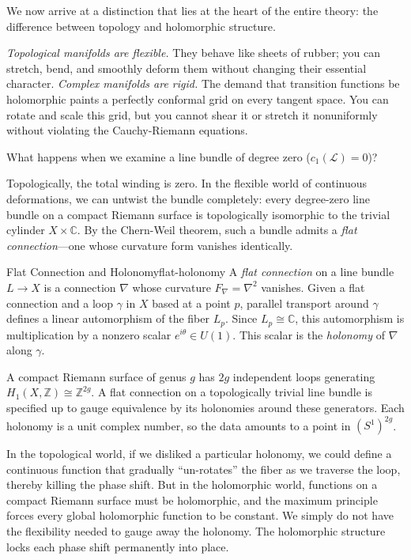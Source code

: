 \documentclass{article}
\newcommand{\C}{{\mathbb{C}}}
\newcommand{\Z}{{\mathbb{Z}}}
\newcommand{\CL}{{\mathcal{L}}}
\begin{document}
We now arrive at a distinction that lies at the heart of the entire theory: the difference between topology and holomorphic structure.

\emph{Topological manifolds are flexible.} They behave like sheets of rubber; you can stretch, bend, and smoothly deform them without changing their essential character. \emph{Complex manifolds are rigid.} The demand that transition functions be holomorphic paints a perfectly conformal grid on every tangent space. You can rotate and scale this grid, but you cannot shear it or stretch it nonuniformly without violating the Cauchy-Riemann equations.

What happens when we examine a line bundle of degree zero ($c_1(\CL) = 0$)?

Topologically, the total winding is zero. In the flexible world of continuous deformations, we can untwist the bundle completely: every degree-zero line bundle on a compact Riemann surface is topologically isomorphic to the trivial cylinder $X \times \C$. By the Chern-Weil theorem, such a bundle admits a \emph{flat connection}---one whose curvature form vanishes identically.

\begin{defn}{Flat Connection and Holonomy}{flat-holonomy}
A \emph{flat connection} on a line bundle $L \to X$ is a connection $\nabla$ whose curvature $F_\nabla = \nabla^2$ vanishes. Given a flat connection and a loop $\gamma$ in $X$ based at a point $p$, parallel transport around $\gamma$ defines a linear automorphism of the fiber $L_p$. Since $L_p \cong \C$, this automorphism is multiplication by a nonzero scalar $e^{i\theta} \in U(1)$. This scalar is the \emph{holonomy} of $\nabla$ along $\gamma$.
\end{defn}

A compact Riemann surface of genus $g$ has $2g$ independent loops generating $H_1(X, \Z) \cong \Z^{2g}$. A flat connection on a topologically trivial line bundle is specified up to gauge equivalence by its holonomies around these generators. Each holonomy is a unit complex number, so the data amounts to a point in $(S^1)^{2g}$.

In the topological world, if we disliked a particular holonomy, we could define a continuous function that
gradually ``un-rotates'' the fiber as we traverse the loop, thereby killing the phase shift. But in the
holomorphic world, functions on a compact Riemann surface must be holomorphic, and the maximum principle
forces every global holomorphic function to be constant. We simply do not have the flexibility needed to gauge away the holonomy. The holomorphic structure locks each phase shift permanently into place.
\end{document}
